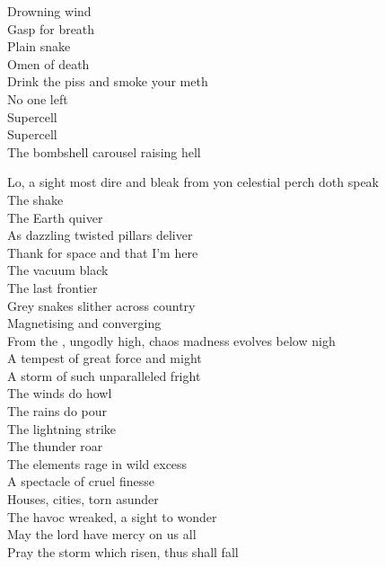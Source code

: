 Drowning wind \\
Gasp for breath \\
Plain snake \\
Omen of death \\
Drink the piss and smoke your meth \\
No one left \\

Supercell \\
Supercell \\
The bombshell carousel raising hell \\



Lo, a sight most dire and bleak from yon celestial perch doth speak \\
The  shake \\
The Earth quiver \\
As dazzling twisted pillars deliver \\

Thank  for space and that I'm here \\
The vacuum black \\
The last frontier \\
Grey snakes slither across country \\
Magnetising and converging \\

From the , ungodly high, chaos madness evolves below nigh \\
A tempest of great force and might \\
A storm of such unparalleled fright \\
The winds do howl \\
The rains do pour \\
The lightning strike \\
The thunder roar \\
The elements rage in wild excess \\
A spectacle of cruel finesse \\
Houses, cities, torn asunder \\
The havoc wreaked, a sight to wonder \\
May the lord have mercy on us all \\
Pray the storm which risen, thus shall fall \\

